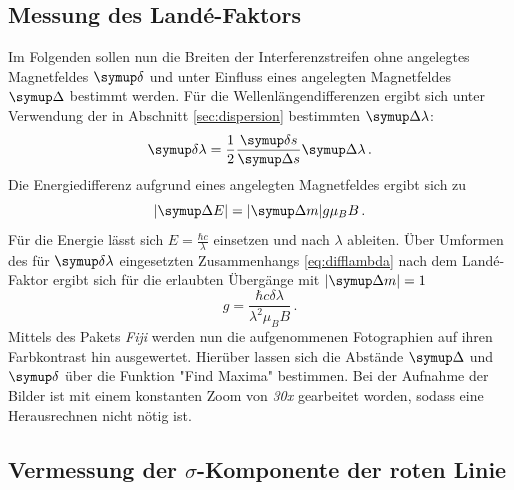 \subsection{Messung des Landé-Faktors}
Im Folgenden sollen nun die Breiten der Interferenzstreifen ohne angelegtes Magnetfeldes $\deltaup$ und unter Einfluss eines angelegten Magnetfeldes $\Deltaup$ bestimmt werden.
Für die Wellenlängendifferenzen ergibt sich unter Verwendung der in Abschnitt \ref{sec:dispersion} bestimmten $\Deltaup \lambda$:
\begin{equation}
  \deltaup \lambda = \frac{1}{2}\frac{\deltaup s}{\Deltaup s}\Deltaup \lambda\,.
  \label{eq:difflambda}
\end{equation}
Die Energiedifferenz aufgrund eines angelegten Magnetfeldes ergibt sich zu
\begin{equation}
  |\Deltaup E| = |\Deltaup m| g \mu_B B\,.
\end{equation}
Für die Energie lässt sich $E=\frac{\hbar c}{\lambda}$ einsetzen und nach $\lambda$ ableiten.
Über Umformen des für $\deltaup \lambda$ eingesetzten Zusammenhangs \eqref{eq:difflambda} nach dem Landé-Faktor ergibt sich für die erlaubten Übergänge mit $|\Deltaup m|=1$
\begin{equation}
  g=\frac{\hbar c \delta \lambda}{\lambda^2 \mu_B B}\,.
\end{equation}
Mittels des Pakets \textit{Fiji} werden nun die aufgenommenen Fotographien auf ihren Farbkontrast hin ausgewertet.
Hierüber lassen sich die Abstände $\Deltaup$ und $\deltaup$ über die Funktion "Find Maxima" bestimmen.
Bei der Aufnahme der Bilder ist mit einem konstanten Zoom von \textit{30x} gearbeitet worden, sodass eine Herausrechnen nicht nötig ist.
\subsection{Vermessung der \texorpdfstring{$\sigma$}{sigma}-Komponente der roten Linie}


